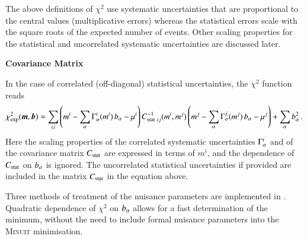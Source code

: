 \begin{description}
The above definitions of $\chi^2$ use
systematic uncertainties that are proportional to the central values 
(multiplicative errors) whereas the statistical errors scale 
with the square roots of the expected number of events. 
Other scaling properties for the statistical and uncorrelated
systematic uncertainties 
are discussed later.



\item \bf{Covariance Matrix} \rm

In the case of correlated (off-diagonal) statistical uncertainties, the $\chi^2$ function
reads
\begin{equation}
\label{eq:chi2gen}
\chi^2_{\rm exp} (\boldsymbol{m},\boldsymbol{b}) = \sum_{ij} \left ( m^i - \sum_\alpha \Gamma^i_\alpha(m^i)\,b_\alpha - \mu^i \right)
  C^{-1}_{{\rm stat}~ij}(m^i,m^j) \left(  m^j - \sum_\alpha \Gamma^j_\alpha(m^j)\,b_\alpha - \mu^j \right) + 
\sum_\alpha b^2_\alpha \,.
\end{equation}
Here the scaling properties of the correlated systematic uncertainties 
$\Gamma^i_\alpha$ and
of the covariance matrix $C_{{\rm stat}}$ are expressed in terms
of $m^i$, and the dependence of $C_{\rm stat}$ on $b_\alpha$ is ignored.
The uncorrelated statistical uncertainties if provided are included in the matrix $C_{{\rm stat}}$ in the equation above.


Three methods of treatment of the nuisance parameters are implemented in \fitter.
Quadratic dependence of $\chi^2$ on $b_\alpha$ allows for a fast determination
of the minimum, without the need to include formal nuisance parameters
into the \textsc{Minuit} minimisation.


\end{description}
